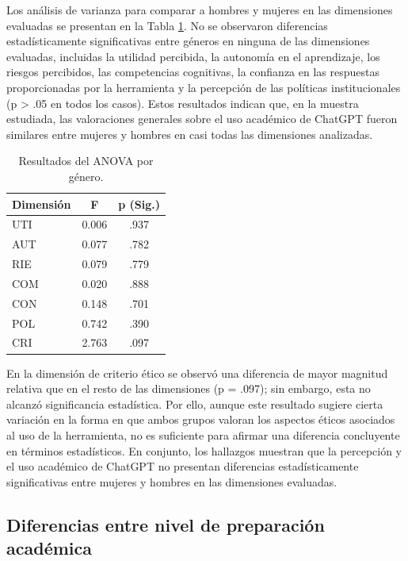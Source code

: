 \documentclass[spanish]{textolivre}
\begin{document}
Los análisis de varianza para comparar a hombres y mujeres en las dimensiones evaluadas se presentan en la Tabla \ref{tab3}. No se observaron diferencias estadísticamente significativas entre géneros en ninguna de las dimensiones evaluadas, incluidas la utilidad percibida, la autonomía en el aprendizaje, los riesgos percibidos, las competencias cognitivas, la confianza en las respuestas proporcionadas por la herramienta y la percepción de las políticas institucionales (p > .05 en todos los casos). Estos resultados indican que, en la muestra estudiada, las valoraciones generales sobre el uso académico de ChatGPT fueron similares entre mujeres y hombres en casi todas las dimensiones analizadas.

\begin{table}[htbp]
\centering
\begin{threeparttable}
\caption{Resultados del ANOVA por género.}
\label{tab3}
\begin{tabular}{lcc}
\toprule
Dimensión & F & p (Sig.) \\ 
\midrule
UTI & 0.006 & .937 \\
AUT & 0.077 & .782 \\
RIE & 0.079 & .779 \\
COM & 0.020 & .888 \\
CON & 0.148 & .701 \\
POL & 0.742 & .390 \\
CRI & 2.763 & .097 \\
\bottomrule
\end{tabular}
\end{threeparttable}
\end{table}

En la dimensión de criterio ético se observó una diferencia de mayor magnitud relativa que en el resto de las dimensiones (p = .097); sin embargo, esta no alcanzó significancia estadística. Por ello, aunque este resultado sugiere cierta variación en la forma en que ambos grupos valoran los aspectos éticos asociados al uso de la herramienta, no es suficiente para afirmar una diferencia concluyente en términos estadísticos. En conjunto, los hallazgos muestran que la percepción y el uso académico de ChatGPT no presentan diferencias estadísticamente significativas entre mujeres y hombres en las dimensiones evaluadas.

\subsection{Diferencias entre nivel de preparación académica}
\end{document}
